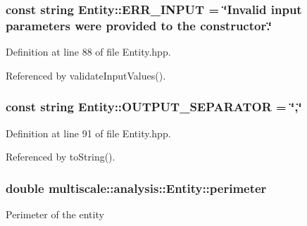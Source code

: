 \hypertarget{classmultiscale_1_1analysis_1_1Entity_a52a27753c0da593552f585f540f003ff}{
\subsubsection[{\-E\-R\-R\-\_\-\-I\-N\-P\-U\-T}]{\setlength{\rightskip}{0pt plus 5cm}const string {\bf \-Entity\-::\-E\-R\-R\-\_\-\-I\-N\-P\-U\-T} = \char`\"{}\-Invalid input parameters were provided to the constructor.\char`\"{}}}\label{classmultiscale_1_1analysis_1_1Entity_a52a27753c0da593552f585f540f003ff}


\-Definition at line 88 of file \-Entity.\-hpp.



\-Referenced by validate\-Input\-Values().

\hypertarget{classmultiscale_1_1analysis_1_1Entity_afe861959b8b22bec466e8118a09ccb54}{
\subsubsection[{\-O\-U\-T\-P\-U\-T\-\_\-\-S\-E\-P\-A\-R\-A\-T\-O\-R}]{\setlength{\rightskip}{0pt plus 5cm}const string {\bf \-Entity\-::\-O\-U\-T\-P\-U\-T\-\_\-\-S\-E\-P\-A\-R\-A\-T\-O\-R} = \char`\"{},\char`\"{}}}\label{classmultiscale_1_1analysis_1_1Entity_afe861959b8b22bec466e8118a09ccb54}


\-Definition at line 91 of file \-Entity.\-hpp.



\-Referenced by to\-String().

\hypertarget{classmultiscale_1_1analysis_1_1Entity_ac7bcdb1cb5eb4369ca8e44d3dbda44a3}{
\subsubsection[{perimeter}]{\setlength{\rightskip}{0pt plus 5cm}double {\bf multiscale\-::analysis\-::\-Entity\-::perimeter}}}\label{classmultiscale_1_1analysis_1_1Entity_ac7bcdb1cb5eb4369ca8e44d3dbda44a3}
\-Perimeter of the entity 

